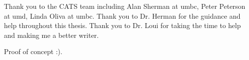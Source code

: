 Thank you to the CATS team including Alan Sherman at \gls{umbc}, Peter Peterson at \gls{umd}, Linda Oliva at \gls{umbc}. Thank you to Dr. Herman for the guidance and help throughout this thesis. Thank you to Dr. Loui for taking the time to help and making me a better writer.


Proof of concept :).
